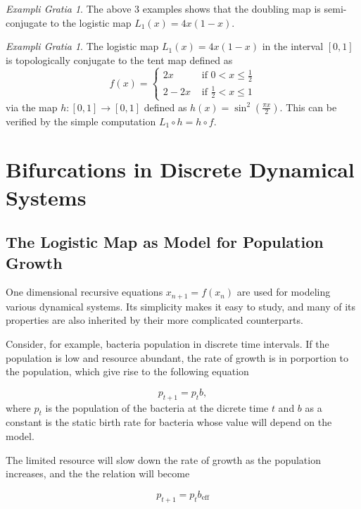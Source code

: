 \documentclass{report}
\theoremstyle{definition}
\theoremstyle{definition}
\theoremstyle{remark}
\newtheorem{example}[thm]{Exampli Gratia}
\newcommand{\be}{b_\text{eff}}
\begin{document}
\begin{example}\label{ex_logistic_at_4}\label{ex_logistic_and_doubling}
	The above 3 examples shows that the doubling map is semi-conjugate to the logistic map $L_1(x) = 4x(1-x)$.
\end{example}

\begin{example}
	The logistic map $L_1(x) = 4x(1-x)$ in the interval $[0,1]$ is topologically conjugate to the tent map defined as 
	\begin{equation}
		f(x) = 
		\begin{cases}
			2x   &\text{ if } 0<x \leq \frac{1}{2} \\ 
			2-2x &\text{ if } \frac{1}{2} < x \leq 1
		\end{cases}
	\end{equation}
	via the map $h: [0,1] \rightarrow [0,1]$ defined as $h(x) = \sin^2(\frac{\pi x}{2})$.
	This can be verified by the simple computation $L_1 \circ h = h \circ f$.
\end{example}

\chapter{Bifurcations in Discrete Dynamical Systems}

\section{The Logistic Map as Model for Population Growth}

One dimensional recursive equations $x_{n+1} = f(x_n)$ are used for modeling various dynamical systems. 
Its simplicity makes it easy to study, and many of its properties are also inherited by their more complicated counterparts.

Consider, for example, bacteria population in discrete time intervals. 
If the population is low and resource abundant, the rate of growth is in porportion to the population, which give rise to the following equation

$$
p_{t+1} = p_{t} b,
$$
where $p_{t}$ is the population of the bacteria at the dicrete time $t$ and $b$ as a constant is the static birth rate for bacteria whose value will depend on the model.

The limited resource will slow down the rate of growth as the population increases, and the the relation will become 

$$
	p_{t+1} =  p_{t} \be
$$
\end{document}
